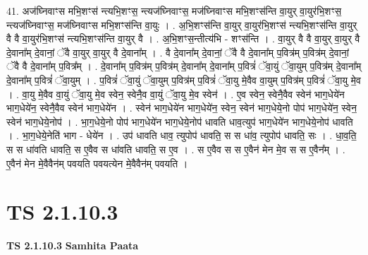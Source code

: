 \documentclass[17pt]{extarticle}
\begin{document}
41. अज॑घ्निवाꣳस मभि॒शꣳस॑ न्त्यभि॒शꣳस॒ न्त्यज॑घ्निवाꣳस॒ मज॑घ्निवाꣳस मभि॒शꣳस॑न्ति वा॒युर् वा॒युर॑भि॒शꣳस॒ न्त्यज॑घ्निवाꣳस॒ मज॑घ्निवाꣳस मभि॒शꣳस॑न्ति वा॒युः । . अ॒भि॒शꣳस॑न्ति वा॒युर् वा॒युर॑भि॒शꣳस॑ न्त्यभि॒शꣳस॑न्ति वा॒युर् वै वै वा॒युर॑भि॒शꣳस॑ न्त्यभि॒शꣳस॑न्ति वा॒युर् वै । . अ॒भि॒शꣳस॒न्तीत्य॑भि - शꣳस॑न्ति । . वा॒युर् वै वै वा॒युर् वा॒युर् वै दे॒वाना᳚म् दे॒वानां॒ ॅवै वा॒युर् वा॒युर् वै दे॒वाना᳚म् । . वै दे॒वाना᳚म् दे॒वानां॒ ॅवै वै दे॒वाना᳚म् प॒वित्र॑म् प॒वित्र॑म् दे॒वानां॒ ॅवै वै दे॒वाना᳚म् प॒वित्र᳚म् । . दे॒वाना᳚म् प॒वित्र॑म् प॒वित्र॑म् दे॒वाना᳚म् दे॒वाना᳚म् प॒वित्रं॑ ॅवा॒युं ॅवा॒युम् प॒वित्र॑म् दे॒वाना᳚म् दे॒वाना᳚म् प॒वित्रं॑ ॅवा॒युम् । . प॒वित्रं॑ ॅवा॒युं ॅवा॒युम् प॒वित्र॑म् प॒वित्रं॑ ॅवा॒यु मे॒वैव वा॒युम् प॒वित्र॑म् प॒वित्रं॑ ॅवा॒यु मे॒व । . वा॒यु मे॒वैव वा॒युं ॅवा॒यु मे॒व स्वेन॒ स्वेनै॒व वा॒युं ॅवा॒यु मे॒व स्वेन॑ । . ए॒व स्वेन॒ स्वेनै॒वैव स्वेन॑ भाग॒धेये॑न भाग॒धेये॑न॒ स्वेनै॒वैव स्वेन॑ भाग॒धेये॑न । . स्वेन॑ भाग॒धेये॑न भाग॒धेये॑न॒ स्वेन॒ स्वेन॑ भाग॒धेये॒नो पोप॑ भाग॒धेये॑न॒ स्वेन॒ स्वेन॑ भाग॒धेये॒नोप॑ । . भा॒ग॒धेये॒नो पोप॑ भाग॒धेये॑न भाग॒धेये॒नोप॑ धावति धाव॒त्युप॑ भाग॒धेये॑न भाग॒धेये॒नोप॑ धावति । . भा॒ग॒धेये॒नेति॑ भाग - धेये॑न । . उप॑ धावति धाव॒ त्युपोप॑ धावति॒ स स धा॑व॒ त्युपोप॑ धावति॒ सः । . धा॒व॒ति॒ स स धा॑वति धावति॒ स ए॒वैव स धा॑वति धावति॒ स ए॒व । . स ए॒वैव स स ए॒वैन॑ मेन मे॒व स स ए॒वैन᳚म् । . ए॒वैन॑ मेन मे॒वैवैन॑म् पवयति पवयत्येन मे॒वैवैन॑म् पवयति । \newline
\pagebreak
{}
\section*{ TS 2.1.10.3 }

\textbf{TS 2.1.10.3 } \newline
\textbf{Samhita Paata} \newline
\end{document}
